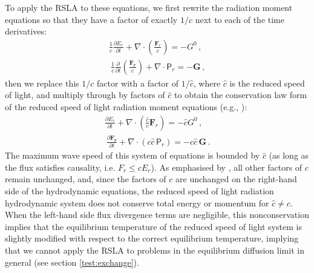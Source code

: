 \documentclass[fleqn,usenatbib]{mnras}
\newcommand{\vc}[1]{{\mathbf{#1}}}
\begin{document}
To apply the RSLA to these equations, we first rewrite the radiation moment equations so that they have a factor of exactly $1/c$ next to each of the time derivatives:
\begin{align}
    \frac{1}{c} \frac{\partial E_r}{\partial t} + \nabla \cdot \left( \frac{\vc{F}_r}{c} \right) = -G^0 \, , \\\
    \frac{1}{c} \frac{\partial}{\partial t} \left( \frac{\vc{F_r}}{c} \right) + \nabla \cdot \mathsf{P}_r = -\vc{G} \, ,
\end{align}
then we replace this $1/c$ factor with a factor of $1/\hat c$, where $\hat c$ is the reduced speed of light, and multiply through by factors of $\hat c$ to obtain the conservation law form of the reduced speed of light radiation moment equations (e.g., \citealt{Skinner_2013}):
\begin{align}
    \frac{\partial E_r}{\partial t} + \nabla \cdot \left( \frac{\hat c}{c} \vc{F}_r \right) = -\hat c G^0 \, , \\\
    \frac{\partial \vc{F_r}}{\partial t} + \nabla \cdot (c \hat c \, \mathsf{P}_r) = -c \hat c \, \vc{G} \, .
\end{align}
The maximum wave speed of this system of equations is bounded by $\hat c$ (as long as the flux satisfies causality, i.e. $F_r \leq cE_r$). As emphasised by \cite{Skinner_2013}, all other factors of $c$ remain unchanged, and, since the factors of $c$ are unchanged on the right-hand side of the hydrodynamic equations, the reduced speed of light radiation hydrodynamic system does not conserve total energy or momentum for $\hat{c} \neq c$. 
When the left-hand side flux divergence terms are negligible, this nonconservation implies that the equilibrium temperature of the reduced speed of light system is slightly modified with respect to the correct equilibrium temperature, implying that we cannot apply the RSLA to problems in the equilibrium diffusion limit in general (see section \ref{test:exchange}).
\end{document}
